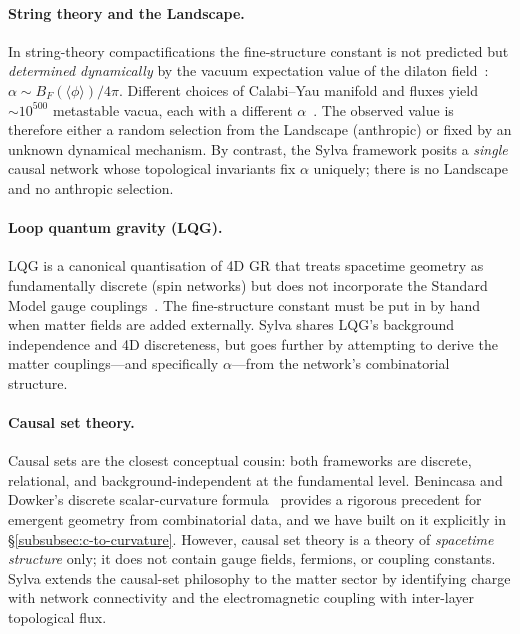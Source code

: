 \documentclass[11pt,a4paper]{article}
\theoremstyle{definition}
\theoremstyle{remark}
\begin{document}
\paragraph{String theory and the Landscape.}  In string-theory compactifications
the fine-structure constant is not predicted but \emph{determined dynamically} by
the vacuum expectation value of the dilaton field~\cite{Damour2002}:
$\alpha \sim B_{F}(\langle\phi\rangle)/4\pi$.  Different choices of Calabi--Yau
manifold and fluxes yield $\sim\!10^{500}$ metastable vacua, each with a different
$\alpha$~\cite{Susskind2003}.  The observed value is therefore either a random
selection from the Landscape (anthropic) or fixed by an unknown dynamical
mechanism.  By contrast, the Sylva framework posits a \emph{single} causal
network whose topological invariants fix $\alpha$ uniquely; there is no
Landscape and no anthropic selection.

\paragraph{Loop quantum gravity (LQG).}  LQG is a canonical quantisation of 4D
GR that treats spacetime geometry as fundamentally discrete (spin networks) but
does not incorporate the Standard Model gauge couplings~\cite{Rovelli2004}.  The
fine-structure constant must be put in by hand when matter fields are added
externally.  Sylva shares LQG's background independence and 4D discreteness, but
goes further by attempting to derive the matter couplings---and specifically
$\alpha$---from the network's combinatorial structure.

\paragraph{Causal set theory.}  Causal sets are the closest conceptual cousin:
both frameworks are discrete, relational, and background-independent at the
fundamental level.  Benincasa and Dowker's discrete scalar-curvature
formula~\cite{Benincasa2010} provides a rigorous precedent for emergent
geometry from combinatorial data, and we have built on it explicitly in
\S\ref{subsubsec:c-to-curvature}.  However, causal set theory is a theory of
\emph{spacetime structure} only; it does not contain gauge fields, fermions, or
coupling constants.  Sylva extends the causal-set philosophy to the matter
sector by identifying charge with network connectivity and the electromagnetic
coupling with inter-layer topological flux.
\end{document}
